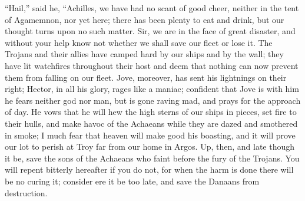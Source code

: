 “Hail,” said he, “Achilles, we have had no scant of good cheer, neither in
the tent of Agamemnon, nor yet here; there has been plenty to eat and
drink, but our thought turns upon no such matter. Sir, we are in the face
of great disaster, and without your help know not whether we shall save
our fleet or lose it. The Trojans and their allies have camped hard by our
ships and by the wall; they have lit watchfires throughout their host and
deem that nothing can now prevent them from falling on our fleet. Jove,
moreover, has sent his lightnings on their right; Hector, in all his
glory, rages like a maniac; confident that Jove is with him he fears
neither god nor man, but is gone raving mad, and prays for the approach of
day. He vows that he will hew the high sterns of our ships in pieces, set
fire to their hulls, and make havoc of the Achaeans while they are dazed
and smothered in smoke; I much fear that heaven will make good his
boasting, and it will prove our lot to perish at Troy far from our home in
Argos. Up, then, and late though it be, save the sons of the Achaeans who
faint before the fury of the Trojans. You will repent bitterly hereafter
if you do not, for when the harm is done there will be no curing it;
consider ere it be too late, and save the Danaans from destruction.

